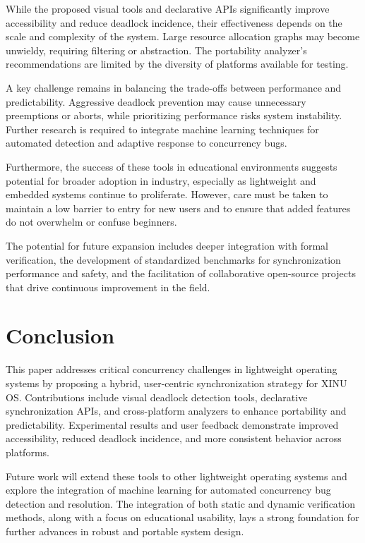\documentclass[conference,a4paper]{IEEEtran}
\begin{document}
While the proposed visual tools and declarative APIs significantly improve accessibility and reduce deadlock incidence, their effectiveness depends on the scale and complexity of the system. Large resource allocation graphs may become unwieldy, requiring filtering or abstraction. The portability analyzer’s recommendations are limited by the diversity of platforms available for testing.

A key challenge remains in balancing the trade-offs between performance and predictability. Aggressive deadlock prevention may cause unnecessary preemptions or aborts, while prioritizing performance risks system instability. Further research is required to integrate machine learning techniques for automated detection and adaptive response to concurrency bugs.

Furthermore, the success of these tools in educational environments suggests potential for broader adoption in industry, especially as lightweight and embedded systems continue to proliferate. However, care must be taken to maintain a low barrier to entry for new users and to ensure that added features do not overwhelm or confuse beginners.

The potential for future expansion includes deeper integration with formal verification, the development of standardized benchmarks for synchronization performance and safety, and the facilitation of collaborative open-source projects that drive continuous improvement in the field.

\section{Conclusion}

This paper addresses critical concurrency challenges in lightweight operating systems by proposing a hybrid, user-centric synchronization strategy for XINU OS. Contributions include visual deadlock detection tools, declarative synchronization APIs, and cross-platform analyzers to enhance portability and predictability. Experimental results and user feedback demonstrate improved accessibility, reduced deadlock incidence, and more consistent behavior across platforms.

Future work will extend these tools to other lightweight operating systems and explore the integration of machine learning for automated concurrency bug detection and resolution. The integration of both static and dynamic verification methods, along with a focus on educational usability, lays a strong foundation for further advances in robust and portable system design.
\end{document}
